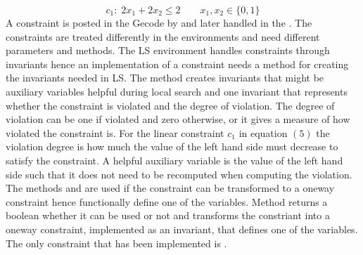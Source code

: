 \begin{equation}
 c_1: \; 2x_1 + 2x_2 \leq 2  \qquad x_1,x_2 \in \{0,1\}
\end{equation} \label{equat_linear} \noindent
A constraint is posted in the Gecode  by  and later handled in the 
. The constraints are treated differently in the environments and need different parameters and 
methods. The LS environment handles constraints through invariants hence an implementation of a constraint needs a 
method for creating the invariants needed in LS. The method  creates invariants that 
might be auxiliary variables helpful during local search and one invariant that represents 
whether the constraint is violated and the degree of violation. The degree of violation can be one if violated 
and zero otherwise, or it gives a measure of how violated the constraint is. For the linear constraint $c_1$ in 
equation $(5)$ the violation degree is how much the value of the left hand side must decrease to satisfy 
the 
constraint. A helpful auxiliary variable is the value of the left hand side such that it does not need to be recomputed 
when computing the violation. \\
The methods  and  are used if the constraint can be transformed 
to a oneway constraint hence functionally define one of the variables. Method  returns a 
boolean whether it can be used or not and  transforms the constriant into a oneway constraint, 
implemented as an invariant, that defines one of the variables. The only constraint that has been implemented is 
. 
